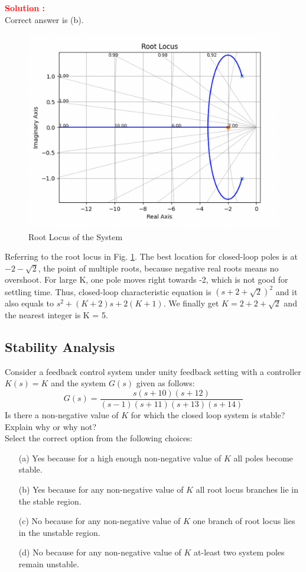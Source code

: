 \documentclass[12pt]{article}
\begin{document}
\textbf{\textcolor{red}{Solution :}} \\
Correct answer is (b).\\
\begin{figure}[H]
    \centering
    \includegraphics[width=0.6\linewidth]{figs/7.6.png}
    \caption{Root Locus of the System}
    \label{fig:prb38}
\end{figure}
Referring to the root locus in Fig. \ref{fig:prb38}. The best location for closed-loop poles is at $-2-\sqrt{2}$, the point of multiple roots, because negative real roots means no overshoot. For large K, one pole moves right towards -2, which is not good for settling time. Thus, closed-loop characteristic equation is $(s+2+\sqrt{2})^2$ and it also equals to $s^2+(K+2)s+2(K+1)$. We finally get $K = 2 + 2+\sqrt{2}$ and the nearest integer is K = 5.\\
\clearpage

\subsection{Stability Analysis}

Consider a feedback control system under unity feedback setting with a controller $K(s)=K$ and the system $G(s)$ given as follows:
\[
G(s)=\frac{s(s+10)(s+12)}{(s-1)(s+11)(s+13)(s+14)}
\]
Is there a non-negative value of $K$ for which the closed loop system is stable? Explain why or why not?\\

Select the correct option from the following choices:
\begin{enumerate}
    \item [(a)] Yes because for a high enough non-negative value of $K$ all poles become stable.
    \item [(b)] Yes because for any non-negative value of $K$ all root locus branches lie in the stable region. 
    \item [(c)] No because for any non-negative value of $K$ one branch of root locus lies in the unstable region.
    \item [(d)] No because for any non-negative value of $K$ at-least two system poles remain unstable.
\end{enumerate}
\end{document}
